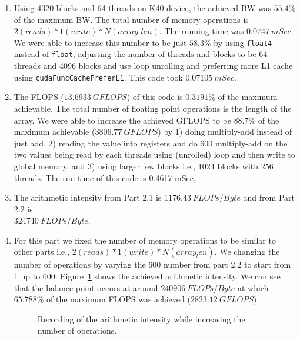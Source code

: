 \documentclass[12pt] {article}
\begin{document}
\begin{enumerate}
\item  Using 4320 blocks and 64 threads on K40 device, the achieved BW was $55.4\%$ of the maximum BW. The total number of memory operations is $2(reads)*1(write)*N(array\_len)$. The running time was $0.0747\ mSec$. We were able to increase this number to be just $58.3\%$ by using \texttt{float4} instead of \texttt{float}, adjusting the number of threads and blocks to be 64 threads and 4096 blocks and use loop unrolling and preferring more L1 cache using \texttt{cudaFuncCachePreferL1}. This code took $0.07105\ mSec$. 

\item The FLOPS ($13.6933\ GFLOPS$) of this code is $0.3191\%$ of the maximum achievable. The total number of floating point operations is the length of the array. We were able to increase the achieved GFLOPS to be $88.7\%$ of the maximum achievable ($3806.77\ GFLOPS$) by 1) doing multiply-add instead of just add, 2) reading the value into registers and do $600$ multiply-add on the two values being read by each threads using (unrolled) loop and then write to global memory, and  3) using larger few blocks i.e., 1024 blocks with 256 threads. The run time of this code is 0.4617 mSec, 


\item The arithmetic intensity from Part 2.1 is $1176.43\ FLOPs/Byte$ and from Part 2.2 is\\ $324740\ FLOPs/Byte$.

\item For this part we fixed the number of memory operations to be similar to other parts i.e., $2(reads)*1(write)*N(array_len)$. We changing the number of operations by varying the 600 number from part 2.2 to start from 1 up to 600. Figure~\ref{fig:part2} shows the achieved arithmetic intensity. We can see that the balance point occurs at around $240906\ FLOPs/Byte$ at which $65.788\%$ of the maximum FLOPS was achieved ($2823.12\ GFLOPS$).
\begin{figure}[!tbh]
\centering        
   \caption{Recording of the arithmetic intensity while increasing the number of operations.}
   \label{fig:part2}
\end{figure}


\end{enumerate}
\end{document}
